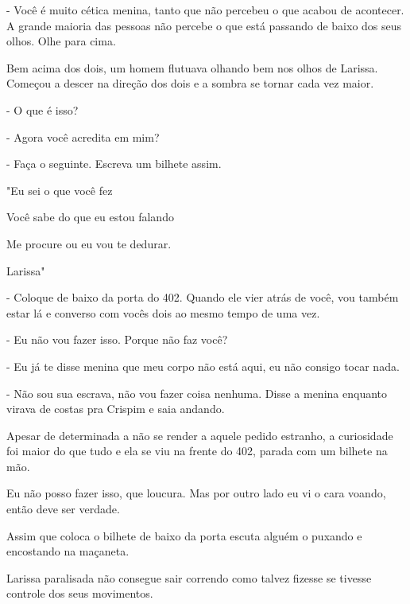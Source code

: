 - Você é muito cética menina, tanto que não percebeu o que acabou de acontecer. A grande maioria das pessoas não percebe o que está passando de baixo dos seus olhos. Olhe para cima.

Bem acima dos dois, um homem flutuava olhando bem nos olhos de Larissa. Começou a descer na direção dos dois e a sombra se tornar cada vez maior.

- O que é isso?

- Agora você acredita em mim?

- Faça o seguinte. Escreva um bilhete assim.

"Eu sei o que você fez

Você sabe do que eu estou falando

Me procure ou eu vou te dedurar.

Larissa"

- Coloque de baixo da porta do 402. Quando ele vier atrás de você, vou também estar lá e converso com vocês dois ao mesmo tempo de uma vez.

- Eu não vou fazer isso. Porque não faz você?

- Eu já te disse menina que meu corpo não está aqui, eu não consigo tocar nada.

- Não sou sua escrava, não vou fazer coisa nenhuma. Disse a menina enquanto virava de costas pra Crispim e saia andando.

Apesar de determinada a não se render a aquele pedido estranho, a curiosidade foi maior do que tudo e ela se viu na frente do 402, parada com um bilhete na mão.

Eu não posso fazer isso, que loucura. Mas por outro lado eu vi o cara voando, então deve ser verdade.

Assim que coloca o bilhete de baixo da porta escuta alguém o puxando e encostando na maçaneta.

Larissa paralisada não consegue sair correndo como talvez fizesse se tivesse controle dos seus movimentos.



